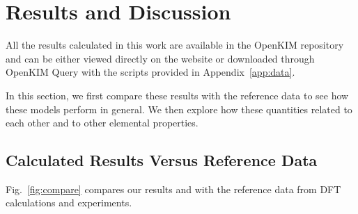 \documentclass[%
 reprint,
 nofootinbib,
 amsmath,amssymb,
 aps,
]{revtex4-1}
\begin{document}
\section{\label{sec:results}Results and Discussion}

All the results calculated in this work are available in the OpenKIM repository \cite{openkim2016} and can be either viewed directly on the website or downloaded through OpenKIM Query with the scripts provided in Appendix~\ref{app:data}.

In this section, we first compare these results with the reference data to see how these models perform in general.
We then explore how these quantities related to each other and to other elemental properties.

\subsection{\label{sec:calcvsref}Calculated Results Versus Reference Data}

Fig.~\ref{fig:compare} compares our results and with the reference data from DFT calculations and experiments.
\end{document}
